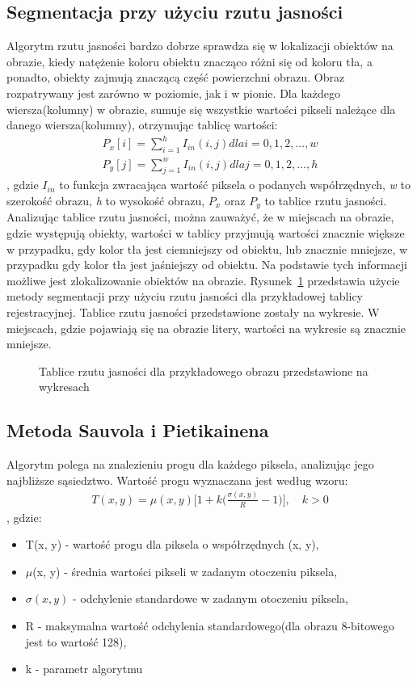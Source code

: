 \subsection{Segmentacja przy użyciu rzutu jasności}
Algorytm rzutu jasności bardzo dobrze sprawdza się w lokalizacji obiektów na obrazie, kiedy natężenie koloru obiektu znacząco różni się od koloru tła, a ponadto, obiekty zajmują znaczącą część powierzchni obrazu. Obraz rozpatrywany jest zarówno w poziomie, jak i w pionie. Dla każdego wiersza(kolumny) w obrazie, sumuje się wszystkie wartości pikseli należące dla danego wiersza(kolumny), otrzymując tablicę wartości:
\begin{gather*}
  P_x[i] = \sum\limits_{i=1}^h I_{in}(i, j) dla i = 0,1,2,...,w \\
  P_y[j] = \sum\limits_{j=1}^w I_{in}(i, j) dla j = 0,1,2,...,h
\end{gather*}, gdzie $I_{in}$ to funkcja zwracająca wartość piksela o podanych współrzędnych, \textit{w} to szerokość obrazu, \textit{h} to wysokość obrazu, $P_x$ oraz $P_y$ to tablice rzutu jasności. Analizując tablice rzutu jasności, można zauważyć, że w miejscach na obrazie, gdzie występują obiekty, wartości w tablicy przyjmują wartości znacznie większe w przypadku, gdy kolor tła jest ciemniejszy od obiektu, lub znacznie mniejsze, w przypadku gdy kolor tła jest jaśniejszy od obiektu. Na podstawie tych informacji możliwe jest zlokalizowanie obiektów na obrazie. Rysunek~\ref{fig:rzut_jasnosci} przedstawia użycie metody segmentacji przy użyciu rzutu jasności dla przykładowej tablicy rejestracyjnej. Tablice rzutu jasności przedstawione zostały na wykresie. W miejscach, gdzie pojawiają się na obrazie litery, wartości na wykresie są znacznie mniejsze.

\begin{figure}
  \centering
  \caption{Tablice rzutu jasności dla przykładowego obrazu przedstawione na wykresach}
  \label{fig:rzut_jasnosci}
\end{figure}
\subsection{Metoda Sauvola i Pietikainena}
Algorytm polega na znalezieniu progu dla każdego piksela, analizując jego najbliższe sąsiedztwo. Wartość progu wyznaczana jest według wzoru:
\begin{gather*}
  T(x, y) = \mu(x, y)\Big[1+k\big(\frac{\sigma(x, y)}{R} - 1\big)\Big], \quad k > 0
\end{gather*},
gdzie:
\begin{itemize}
  \item T(x, y) - wartość progu dla piksela o współrzędnych (x, y),
  \item $\mu$(x, y) - średnia wartości pikseli w zadanym otoczeniu piksela,
  \item $\sigma(x, y)$ - odchylenie standardowe w zadanym otoczeniu piksela,
  \item R - maksymalna wartość odchylenia standardowego(dla obrazu 8-bitowego jest to wartość 128),
  \item k - parametr algorytmu
\end{itemize}
